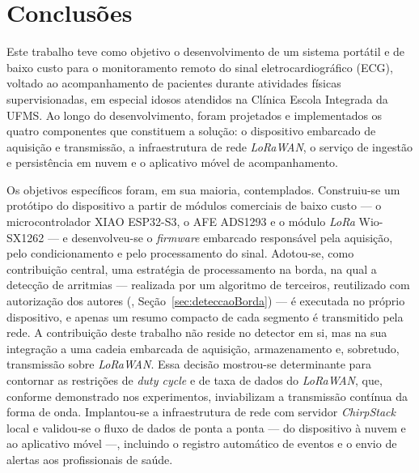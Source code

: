 \chapter{Conclusões}
\label{chap:conclusoes}

Este trabalho teve como objetivo o desenvolvimento de um sistema portátil e de baixo custo para o monitoramento remoto do sinal eletrocardiográfico (ECG), voltado ao acompanhamento de pacientes durante atividades físicas supervisionadas, em especial idosos atendidos na Clínica Escola Integrada da \acs{UFMS}. Ao longo do desenvolvimento, foram projetados e implementados os quatro componentes que constituem a solução: o dispositivo embarcado de aquisição e transmissão, a infraestrutura de rede \textit{LoRaWAN}, o serviço de ingestão e persistência em nuvem e o aplicativo móvel de acompanhamento.

Os objetivos específicos foram, em sua maioria, contemplados. Construiu-se um protótipo do dispositivo a partir de módulos comerciais de baixo custo — o microcontrolador XIAO ESP32-S3, o \acs{AFE} ADS1293 e o módulo \textit{LoRa} Wio-SX1262 — e desenvolveu-se o \textit{firmware} embarcado responsável pela aquisição, pelo condicionamento e pelo processamento do sinal. Adotou-se, como contribuição central, uma estratégia de processamento na borda, na qual a detecção de arritmias — realizada por um algoritmo de terceiros, reutilizado com autorização dos autores (, Seção~\ref{sec:deteccaoBorda}) — é executada no próprio dispositivo, e apenas um resumo compacto de cada segmento é transmitido pela rede. A contribuição deste trabalho não reside no detector em si, mas na sua integração a uma cadeia embarcada de aquisição, armazenamento e, sobretudo, transmissão sobre \textit{LoRaWAN}. Essa decisão mostrou-se determinante para contornar as restrições de \textit{duty cycle} e de taxa de dados do \textit{LoRaWAN}, que, conforme demonstrado nos experimentos, inviabilizam a transmissão contínua da forma de onda. Implantou-se a infraestrutura de rede com servidor \textit{ChirpStack} local e validou-se o fluxo de dados de ponta a ponta — do dispositivo à nuvem e ao aplicativo móvel —, incluindo o registro automático de eventos e o envio de alertas aos profissionais de saúde.

